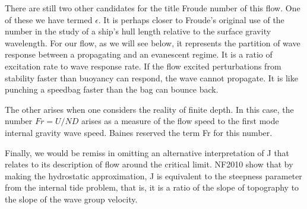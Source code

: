 \documentclass[12pt]{article}
\begin{document}
There are still two other candidates for the title Froude number of this flow. One of these we have termed $\epsilon$. It is perhaps closer to Froude's original use of the number in the study of a ship's hull length relative to the surface gravity wavelength. For our flow, as we will see below, it represents the partition of wave response between a propagating and an evanescent regime. It is a ratio of excitation rate to wave response rate. If the flow excited perturbations from stability faster than buoyancy can respond, the wave cannot propagate. It is like punching a speedbag faster than the bag can bounce back. 

The other arises when one considers the reality of finite depth. In this case, the number $Fr=U/ND$ arises as a measure of the flow speed to the first mode internal gravity wave speed. Baines reserved the term Fr for this number. 

Finally, we would be remiss in omitting an alternative interpretation of J that relates to its description of flow around the critical limit. NF2010 show that by making the hydrostatic approximation, J is equivalent to the steepness parameter from the internal tide problem, that is, it is a ratio of the slope of topography to the slope of the wave group velocity. 
\end{document}
